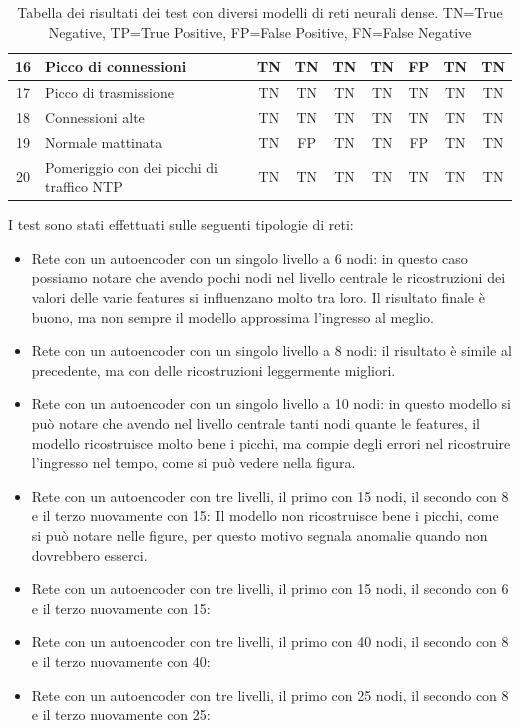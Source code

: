 \begin{table}
\begin{tabularx}{\textwidth}{||c X c c c c c c c||}
        16 & Picco di connessioni & TN & TN & TN & TN & \cellcolor{orange} FP & TN & TN\\        
        \hline
        17 & Picco di trasmissione & TN & TN & TN & TN & TN & TN & TN\\        
        \hline
        18 & Connessioni alte & TN & TN & TN & TN & TN & TN & TN\\
        \hline
        19 & Normale mattinata & TN & \cellcolor{orange} FP & TN & TN & \cellcolor{orange} FP & TN & TN\\ 
        \hline
        20 & Pomeriggio con dei picchi di traffico NTP & TN & TN & TN & TN & TN & TN & TN\\ 
        \hline
    \end{tabularx}
    \caption{Tabella dei risultati dei test con diversi modelli di reti neurali dense. TN=True Negative, TP=True Positive,  FP=False Positive,  FN=False Negative}
    \label{table:dense_tests}
\end{table}

I test sono stati effettuati sulle seguenti tipologie di reti:
\begin{itemize}
    \item Rete con un autoencoder con un singolo livello a 6 nodi: in questo caso possiamo notare che avendo pochi nodi nel livello centrale le ricostruzioni dei valori delle varie features si influenzano molto tra loro. Il risultato finale è buono, ma non sempre il modello approssima l'ingresso al meglio.
    \item Rete con un autoencoder con un singolo livello a 8 nodi: il risultato è simile al precedente, ma con delle ricostruzioni leggermente migliori.
    \item Rete con un autoencoder con un singolo livello a 10 nodi: in questo modello si può notare che avendo nel livello centrale tanti nodi quante le features, il modello ricostruisce molto bene i picchi, ma compie degli errori nel ricostruire l'ingresso nel tempo, come si può vedere nella figura.
    \item Rete con un autoencoder con tre livelli, il primo con 15 nodi, il secondo con 8 e il terzo nuovamente con 15: Il modello non ricostruisce bene i picchi, come si può notare nelle figure, per questo motivo segnala anomalie quando non dovrebbero esserci.
    \item Rete con un autoencoder con tre livelli, il primo con 15 nodi, il secondo con 6 e il terzo nuovamente con 15: %

    \item Rete con un autoencoder con tre livelli, il primo con 40 nodi, il secondo con 8 e il terzo nuovamente con 40:  %
    \item Rete con un autoencoder con tre livelli, il primo con 25 nodi, il secondo con 8 e il terzo nuovamente con 25:  %

\end{itemize}

